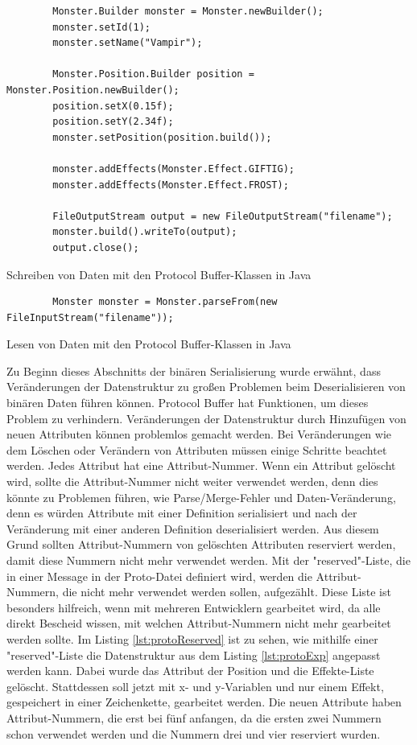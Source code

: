 \begin{listing}[htp]
    \begin{verbatim} 
        Monster.Builder monster = Monster.newBuilder();
        monster.setId(1);
        monster.setName("Vampir");

        Monster.Position.Builder position = Monster.Position.newBuilder();
        position.setX(0.15f);
        position.setY(2.34f);
        monster.setPosition(position.build());

        monster.addEffects(Monster.Effect.GIFTIG);
        monster.addEffects(Monster.Effect.FROST);

        FileOutputStream output = new FileOutputStream("filename");
        monster.build().writeTo(output);
        output.close();
    \end{verbatim}
    \caption{Schreiben von Daten mit den Protocol Buffer-Klassen in Java}
    \label{lst:protobufJavaWrite}
\end{listing}

\begin{listing}[htp]
    \begin{verbatim} 
        Monster monster = Monster.parseFrom(new FileInputStream("filename"));
    \end{verbatim}
    \caption{Lesen von Daten mit den Protocol Buffer-Klassen in Java}
    \label{lst:protobufJavaRead}
\end{listing}

Zu Beginn dieses Abschnitts der binären Serialisierung wurde erwähnt, dass Veränderungen der Datenstruktur zu großen Problemen beim Deserialisieren von binären Daten führen können. Protocol Buffer hat Funktionen, um dieses Problem zu verhindern. Veränderungen der Datenstruktur durch Hinzufügen von neuen Attributen können problemlos gemacht werden. Bei Veränderungen wie dem Löschen oder Verändern von Attributen müssen einige Schritte beachtet werden. Jedes Attribut hat eine Attribut-Nummer. Wenn ein Attribut gelöscht wird, sollte die Attribut-Nummer nicht weiter verwendet werden, denn dies könnte zu Problemen führen, wie Parse/Merge-Fehler und Daten-Veränderung, denn es würden Attribute mit einer Definition serialisiert und nach der Veränderung mit einer anderen Definition deserialisiert werden. Aus diesem Grund sollten Attribut-Nummern von gelöschten Attributen reserviert werden, damit diese Nummern nicht mehr verwendet werden. Mit der "reserved"-Liste, die in einer Message in der Proto-Datei definiert wird, werden die Attribut-Nummern, die nicht mehr verwendet werden sollen, aufgezählt. Diese Liste ist besonders hilfreich, wenn mit mehreren Entwicklern gearbeitet wird, da alle direkt Bescheid wissen, mit welchen Attribut-Nummern nicht mehr gearbeitet werden sollte. Im Listing \ref{lst:protoReserved} ist zu sehen, wie mithilfe einer "reserved"-Liste die Datenstruktur aus dem Listing \ref{lst:protoExp} angepasst werden kann. Dabei wurde das Attribut der Position und die Effekte-Liste gelöscht. Stattdessen soll jetzt mit x- und y-Variablen und nur einem Effekt, gespeichert in einer Zeichenkette, gearbeitet werden. Die neuen Attribute haben Attribut-Nummern, die erst bei fünf anfangen, da die ersten zwei Nummern schon verwendet werden und die Nummern drei und vier reserviert wurden.\cite{protobufLanguageGuide}

